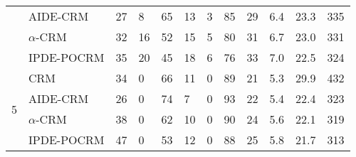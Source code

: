 \begin{tabular*}{\textwidth}{@{\extracolsep\fill}clllllllllll@{\extracolsep\fill}}
 & AIDE-CRM & 27 & 8 & 65 & 13 & 3 & 85 & 29 & 6.4 & 23.3 & 335\\
 & $\alpha$-CRM & 32 & 16 & 52 & 15 & 5 & 80 & 31 & 6.7 & 23.0 & 331\\
 & IPDE-POCRM & 35 & 20 & 45 & 18 & 6 & 76 & 33 & 7.0 & 22.5 & 324\\
\midrule
\multirow{4}{2em}{5} & CRM & 34 & 0 & 66 & 11 & 0 & 89 & 21 & 5.3 & 29.9 & 432\\
 & AIDE-CRM & 26 & 0 & 74 & 7 & 0 & 93 & 22 & 5.4 & 22.4 & 323\\
 & $\alpha$-CRM & 38 & 0 & 62 & 10 & 0 & 90 & 24 & 5.6 & 22.1 & 319\\
 & IPDE-POCRM & 47 & 0 & 53 & 12 & 0 & 88 & 25 & 5.8 & 21.7 & 313\\
\bottomrule
\end{tabular*}
